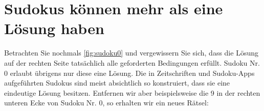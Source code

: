 \section{Sudokus können mehr als eine Lösung haben}
Betrachten Sie nochmals \cref{fig:sudoku0} und vergewissern Sie sich, dass die Lösung auf der rechten Seite tatsächlich alle geforderten Bedingungen erfüllt. Sudoku Nr. 0 erlaubt übrigens nur diese eine Lösung. Die in Zeitschriften und Sudoku-Apps aufgeführten Sudokus sind meist absichtlich so konstruiert, dass sie eine eindeutige Lösung besitzen. Entfernen wir aber beispielsweise die 9 in der rechten unteren Ecke von Sudoku Nr. 0, so erhalten wir ein neues Rätsel:
\begin{figure}[H]
    \centering
{}
\end{figure}
